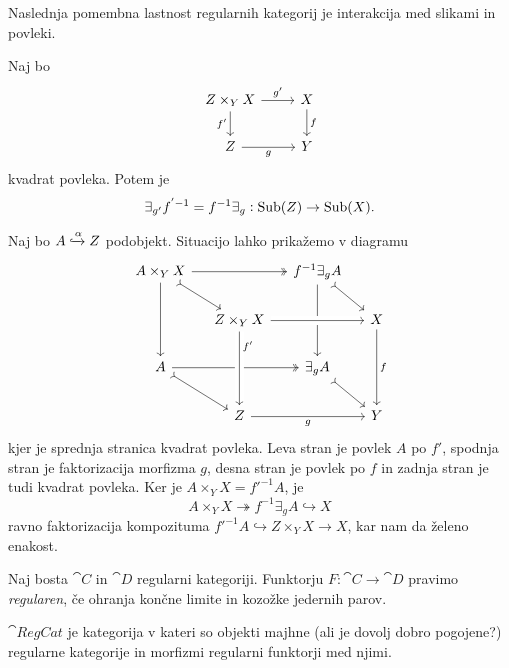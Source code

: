 \documentclass[../kategoricna_logika.tex]{subfiles}
\begin{document}
Naslednja pomembna lastnost regularnih kategorij je interakcija med
slikami in povleki.
\begin{lema}\label{lema:zamenjava-povleka-in-slike}
  Naj bo
  \begin{equation*}
    \begin{tikzcd}
      Z \times_Y X \ar[d, "f'"'] \ar[r, "g'"] & X \ar[d, "f"] \\
      Z \ar[r, "g"'] & Y
    \end{tikzcd}
  \end{equation*}
  kvadrat povleka. Potem je
  $$\exists_{g'}f^{'-1} = f^{-1}\exists_g : \operatorname{Sub}(Z) \to \operatorname{Sub}(X).$$
\end{lema}
\begin{dokaz}
  Naj bo $A \xhookrightarrow{\alpha} Z$ podobjekt.  Situacijo lahko
  prikažemo v diagramu
  \begin{equation*}
    \begin{tikzcd}[column sep=small]
      A \times_Y X \ar[dd] \ar[dr, tail] \ar[rr, two heads] & &
      f^{-1}\exists_g A \ar[dd] \ar[dr, tail] & \\
      & Z \times_Y X  \ar[rr, crossing over] & & X \ar[dd, "f"] \\
      A \ar[dr, tail] \ar[rr, two heads] & & \exists_g A \ar[dr, tail] & \\
      & Z \ar[rr, "g"'] \ar[from=uu, pos=0.2, crossing over, "f'"] & &
      Y
    \end{tikzcd}
  \end{equation*}
  kjer je sprednja stranica kvadrat povleka.  Leva stran je povlek $A$
  po $f'$, spodnja stran je faktorizacija morfizma $g$, desna stran je
  povlek po $f$ in zadnja stran je tudi kvadrat povleka.  Ker je
  $A \times_Y X = f'^{-1}A$, je
  \[A \times_Y X \twoheadrightarrow f^{-1}\exists_g A \hookrightarrow X\]
  ravno faktorizacija kompozituma
  $f'^{-1}A \hookrightarrow Z \times_Y X \to X$, kar nam da želeno
  enakost.
\end{dokaz}
\begin{definicija}
  Naj bosta $\cat{C}$ in $\cat{D}$ regularni kategoriji.  Funktorju
  ${F : \cat{C} \to \cat{D}}$ pravimo \emph{regularen}, če ohranja
  končne limite in kozožke jedernih parov.
\end{definicija}
\begin{definicija}
  $\cat{RegCat}$ je kategorija v kateri so objekti majhne (ali je
  dovolj dobro pogojene?) regularne kategorije in morfizmi regularni funktorji
  med njimi.
\end{definicija}
\end{document}
